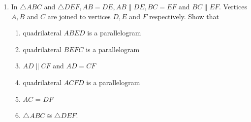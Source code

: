 \begin{enumerate}[label=\arabic*.,ref=\thesubsection.\theenumi]
%
\item In  $\triangle  ABC$ and  $\triangle  DEF, AB = DE, AB  \parallel  DE, BC = EF$ and $BC  \parallel  EF$. Vertices $A, B$ and $C$ are joined to vertices $D, E$ and $F$ respectively. Show that 
\begin{enumerate}
\item quadrilateral $ABED$ is a parallelogram 
\item quadrilateral $BEFC$ is a parallelogram 
\item $AD  \parallel  CF$ and $AD = CF$ 
\item quadrilateral $ACFD$ is a parallelogram 
\item $AC$ = $DF$ 
\item  $\triangle  ABC  \cong   \triangle  DEF$.
%
\end{enumerate}


\end{enumerate}

